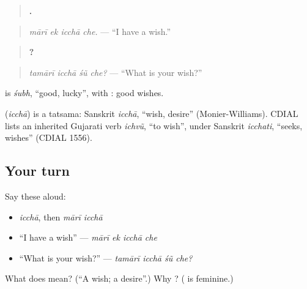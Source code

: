 \begin{quote}
\textbf{   .}
\end{quote}

\begin{quote}
\emph{mārī ek icchā che.} — \textquotedblleft{}I have a wish.\textquotedblright{}
\end{quote}

\begin{quote}
\textbf{   ?}
\end{quote}

\begin{quote}
\emph{tamārī icchā śũ che?} — \textquotedblleft{}What is your wish?\textquotedblright{}
\end{quote}

\textbf{} is \emph{śubh}, \textquotedblleft{}good, lucky\textquotedblright{}, with \textbf{}: good wishes.

\begin{cousinweb}
\textbf{} (\emph{icchā}) is a tatsama: Sanskrit \emph{icchā}, \textquotedblleft{}wish, desire\textquotedblright{} (Monier-Williams). CDIAL lists an inherited Gujarati verb \emph{ichvũ}, \textquotedblleft{}to wish\textquotedblright{}, under Sanskrit \emph{icchati}, \textquotedblleft{}seeks, wishes\textquotedblright{} (CDIAL 1556).
\end{cousinweb}

\subsection*{Your turn}
Say these aloud:

\begin{itemize}
\raggedright
  \item \emph{icchā}, then \emph{mārī icchā}
  \item \textquotedblleft{}I have a wish\textquotedblright{} — \emph{mārī ek icchā che}
  \item \textquotedblleft{}What is your wish?\textquotedblright{} — \emph{tamārī icchā śũ che?}
\end{itemize}

\begin{tcolorbox}[breakable,colback=teal!4,colframe=teal!35!black,title={Before you move on}]
What does \textbf{} mean? (\textquotedblleft{}A wish; a desire\textquotedblright{}.) Why \textbf{}? (\textbf{} is feminine.)
\end{tcolorbox}
